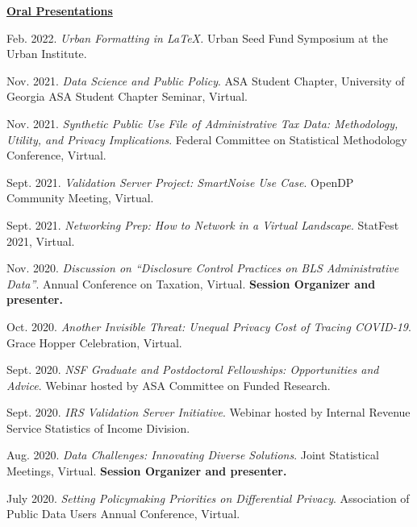 \documentclass[11pt, letterpaper, roman]{moderncv} %
\begin{document}
\begin{etaremune}[topsep=0pt, itemsep=3pt, partopsep=0pt, parsep=0pt]
\vspace{6pt}
\hspace{-0.30in}\underline{\textbf{\large Oral Presentations}}\normalsize
    \item Feb. 2022. \textit{Urban Formatting in LaTeX.} Urban Seed Fund Symposium at the Urban Institute.

    \item Nov. 2021. \textit{Data Science and Public Policy}. ASA Student Chapter, University of Georgia ASA Student Chapter Seminar, Virtual.
    
    \item Nov. 2021. \textit{Synthetic Public Use File of Administrative Tax Data: Methodology, Utility, and Privacy Implications}. Federal Committee on Statistical Methodology Conference, Virtual.
    
    \item Sept. 2021. \textit{Validation Server Project: SmartNoise Use Case}. OpenDP Community Meeting, Virtual.
    
    \item Sept. 2021. \textit{Networking Prep: How to Network in a Virtual Landscape}. StatFest 2021, Virtual.
    
    \item Nov. 2020. \textit{Discussion on ``Disclosure Control Practices on BLS Administrative Data''}. Annual Conference on Taxation, Virtual. \textbf{Session Organizer and presenter.}
    
    \item Oct. 2020. \textit{Another Invisible Threat: Unequal Privacy Cost of Tracing COVID-19}. Grace Hopper Celebration, Virtual.
    
    \item Sept. 2020. \textit{NSF Graduate and Postdoctoral Fellowships: Opportunities and Advice}. Webinar hosted by ASA Committee on Funded Research.
    
    \item Sept. 2020. \textit{IRS Validation Server Initiative}. Webinar hosted by Internal Revenue Service Statistics of Income Division.
    
    \item Aug. 2020. \textit{Data Challenges: Innovating Diverse Solutions}. Joint Statistical Meetings, Virtual. \textbf{Session Organizer and presenter.}
    
    \item July 2020. \textit{Setting Policymaking Priorities on Differential Privacy}. Association of Public Data Users Annual Conference, Virtual.
    

\end{etaremune}
\end{document}
